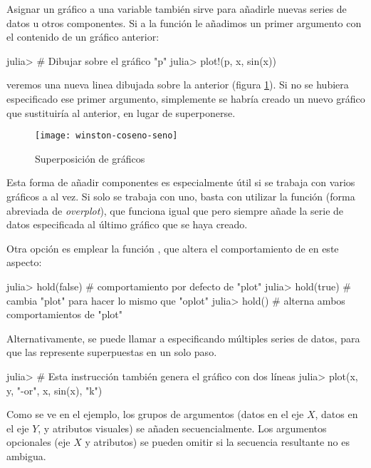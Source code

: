 Asignar un gráfico a una variable también sirve para añadirle nuevas series de datos u otros componentes. Si a la función  le añadimos un primer argumento con el contenido de un gráfico anterior:

\begin{jlconcode}
julia> # Dibujar sobre el gráfico "p"
julia> plot!(p, x, sin(x))
\end{jlconcode}

veremos una nueva linea dibujada sobre la anterior (figura \ref{fig:winston-superposicion}). Si no se hubiera especificado ese primer argumento, simplemente se habría creado un nuevo gráfico que sustituiría al anterior, en lugar de superponerse.

\begin{figure}
\centering
\texttt{[image: winston-coseno-seno]}
\caption{Superposición de gráficos}
\label{fig:winston-superposicion}
\end{figure}

Esta forma de añadir componentes es especialmente útil si se trabaja con varios gráficos a al vez. Si solo se trabaja con uno, basta con utilizar la función  (forma abreviada de \emph{overplot}), que funciona igual que  pero siempre añade la serie de datos especificada al último gráfico que se haya creado.

Otra opción es emplear la función , que altera el comportamiento de  en este aspecto:

\begin{jlconcode}
julia> hold(false) # comportamiento por defecto de "plot"
julia> hold(true)  # cambia "plot" para hacer lo mismo que "oplot"
julia> hold()      # alterna ambos comportamientos de "plot"
\end{jlconcode}

Alternativamente, se puede llamar a  especificando múltiples series de datos, para que las represente superpuestas en un solo paso.

\begin{jlconcode}
julia> # Esta instrucción también genera el gráfico con dos líneas
julia> plot(x, y, "-or", x, sin(x), "k")
\end{jlconcode}

Como se ve en el ejemplo, los grupos de argumentos (datos en el eje $X$, datos en el eje $Y$, y atributos visuales) se añaden secuencialmente. Los argumentos opcionales (eje $X$ y atributos) se pueden omitir si la secuencia resultante no es ambigua.

